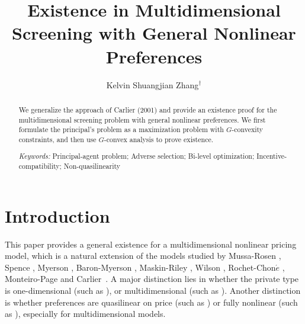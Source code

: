 \documentclass[a4paper, 11pt]{amsart}
\title{Existence in Multidimensional Screening with General Nonlinear Preferences}%
\author{Kelvin Shuangjian Zhang$^\dagger$}\thanks{$^\dagger$Department of Mathematics, University of Toronto, Toronto, Ontario, Canada, M5S 2E4 {\tt szhang@math.toronto.edu}}
\numberwithin{equation}{section}
\theoremstyle{plain}
\theoremstyle{definition}
\theoremstyle{remark}
\begin{document}
\begin{abstract}
	We generalize the approach of Carlier (2001) and provide an existence proof for the multidimensional screening problem with general nonlinear preferences. 
	{We first} formulate the principal's {problem} %
	as a maximization problem with $G$-convexity constraints, %
	{and then use $G$-convex analysis to prove existence.} \medskip 

	{\it Keywords:} Principal-agent problem; Adverse selection; Bi-level optimization; Incentive-compatibility; Non-quasilinearity
\end{abstract}

\bigskip

\maketitle

\section{Introduction}\label{section:introduction}
	This paper provides a general existence for a multidimensional nonlinear pricing model,  which is a natural extension of the models studied by Mussa-Rosen \cite{MussaRosen78}, %
	Spence \cite{Spence74, Spence80}, Myerson \cite{Myerson81}, Baron-Myerson \cite{BaronMyerson82}, Maskin-Riley \cite{MaskinRiley84}, Wilson \cite{Wilson93}, Rochet-Chon$\acute{e}$ \cite{RochetChone98}, Monteiro-Page \cite{MonteiroPage98} and  Carlier~\cite{Carlier01}. A major distinction lies in whether the private type is one-dimensional (such as \cite{MussaRosen78, MaskinRiley84}), or multidimensional (such as \cite{RochetChone98,MonteiroPage98, Carlier01}). Another distinction is whether preferences are quasilinear on price (such as \cite{Armstrong96, Carlier01}) or fully nonlinear (such as \cite{NoldekeSamuelson15p, McCannZhang17}), especially for multidimensional models.  
	\medskip
	
\end{document}

